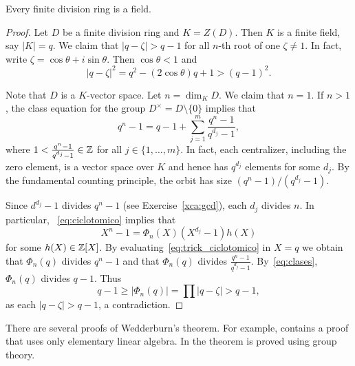 \begin{theorem}[Wedderburn]
\label{thm:Wedderburn} 
	Every finite division ring is a field. 
\end{theorem}

\begin{proof}
    Let $D$ be a finite division ring   
	and $K=Z(D)$. Then $K$ is a finite field, say $|K|=q$. 
	We claim that $|q-\zeta|>q-1$ for all $n$-th 
	root of one $\zeta\ne 1$.  In fact, write $\zeta=\cos\theta+i\sin\theta$. Then 
	$\cos\theta<1$ and 
	\[
	|q-\zeta|^2=q^2-(2\cos\theta)q+1>(q-1)^2.
	\]
	
	Note that
	$D$ is a $K$-vector space. Let 
	$n=\dim_KD$.  We claim that $n=1$. If $n>1$, the 
	class equation for the group 
	$D^\times=D\setminus\{0\}$ 
        implies that 
	\begin{equation}
		\label{eq:clases}
		q^n-1=q-1+\sum_{j=1}^m \frac{q^n-1}{q^{d_j}-1},
	\end{equation}
	where $1<\frac{q^n-1}{q^{d_j}-1}\in\mathbb{Z}$ for all $j\in\{1,\dots,m\}$. 
    In fact, each centralizer, including the zero element, 
    is a vector space over $K$ and hence has $q^{d_j}$ elements for some $d_j$. 
    By the fundamental counting principle, the orbit has size $(q^n-1)/(q^{d_j}-1)$. 
       
	Since $d^{d_j}-1$ divides $q^n-1$ (see Exercise~\ref{xca:gcd}), 
    each $d_j$ divides $n$. In particular,
	~\eqref{eq:ciclotomico} implies that 
	\begin{equation}
		\label{eq:trick_ciclotomico}
		X^n-1=\Phi_n(X)(X^{d_j}-1)h(X)
	\end{equation}
	for some $h(X)\in\mathbb{Z}[X]$. 
	By evaluating~\eqref{eq:trick_ciclotomico} in $X=q$  
	we obtain that $\Phi_n(q)$ divides $q^n-1$ and that $\Phi_n(q)$
	divides $\frac{q^n-1}{q^{d_j}-1}$. By~\eqref{eq:clases}, 
	$\Phi_n(q)$ divides $q-1$. 
	Thus  
	\[
		q-1\geq |\Phi_n(q)|=\prod |q-\zeta|>q-1,
	\]
	as each $|q-\zeta|>q-1$, 
	a contradiction. 
\end{proof}

There are several proofs of Wedderburn's theorem. 
For example, \cite{MR360687} contains a proof that uses only 
elementary linear algebra. In \cite[Chapter 14]{MR896269}
the theorem is proved using group theory. 

